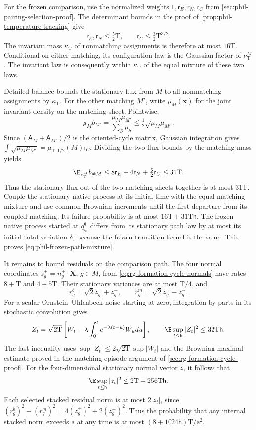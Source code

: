 For the frozen comparison, use the normalized weights
\(1,\mathsf r_E,\mathsf r_N,\mathsf r_C\) from
\cref{sec:phil-pairing-selection-proof}. The determinant bounds in the
proof of \cref{prop:phil-temperature-tracking} give
\[
 \mathsf r_E,\mathsf r_N\le\tfrac52\mathrm T,
 \qquad \mathsf r_C\le\tfrac32\mathrm T^{3/2}.
\]
The invariant mass \(\kappa_{\mathrm T}\) of nonmatching assignments
is therefore at most \(16\mathrm T\). Conditional on either matching,
its configuration law is the Gaussian factor of \(\nu_{\mathrm T}^M\).
The invariant law is consequently within \(\kappa_{\mathrm T}\) of
the equal mixture of these two laws.

Detailed balance bounds the stationary flux from \(M\) to all
nonmatching assignments by \(\kappa_{\mathrm T}\).
For the other matching \(M'\), write \(\mu_M(\mathbf x)\) for the
joint invariant density on the matching sheet. Pointwise,
\[
 \mu_M b_{M'}
 =\frac{\mu_M\mu_{M'}}{\sum_S\mu_S}
 \le\tfrac12\sqrt{\mu_M\mu_{M'}}.
\]
Since \((\mathsf A_M+\mathsf A_{M'})/2\) is the oriented-cycle
matrix, Gaussian integration gives
\(\int\sqrt{\mu_M\mu_{M'}}=\mu_{\mathrm T,1/2}(M)\mathsf r_C\).
Dividing the two flux bounds by the matching mass yields
\[
 \E_{\nu_{\mathrm T}^M}b_{\ne M}
 \le8\mathsf r_E+4\mathsf r_N+\tfrac52\mathsf r_C
 \le31\mathrm T.
\]
Thus the stationary flux out of the two matching sheets together is
at most \(31\mathrm T\). Couple the stationary native process at
its initial time with the equal matching mixture and use common
Brownian increments until the first departure from its coupled
matching. Its failure probability is at most
\(16\mathrm T+31\mathrm T\mathsf h\). The frozen native process
started at \(q_{t_0}^0\) differs from its stationary path law by at
most its initial total variation \(\delta\), because the frozen
transition kernel is the same. This proves
\cref{eq:phil-frozen-path-mixture}.

It remains to bound residuals on the comparison path.
The four normal coordinates
\(z_g^\pm=n_g^\pm\cdot\mathbf X\), \(g\in M\), from
\cref{eq:rg-formation-cycle-normals} have rates
\(8+\mathrm T\) and \(4+5\mathrm T\). Their stationary variances
are at most \(\mathrm T/4\), and
\[
 r_g^b=\sqrt2z_g^++z_g^-,\qquad
 r_g^m=\sqrt2z_g^+-z_g^-.
\]
For a scalar Ornstein--Uhlenbeck noise starting at zero, integration
by parts in its stochastic convolution gives
\[
 Z_t=\sqrt{2\mathrm T}
 \left[W_t-\lambda\int_0^te^{-\lambda(t-u)}W_u du\right],
 \qquad
 \E\sup_{t\le\mathsf h}|Z_t|^2\le32\mathrm T\mathsf h.
\]
The last inequality uses
\(\sup|Z_t|\le2\sqrt{2\mathrm T}\sup|W_t|\) and the Brownian
maximal estimate proved in the matching-episode argument of
\cref{sec:rg-formation-cycle-proof}.
For the four-dimensional stationary normal vector \(z\), it follows
that
\[
 \E\sup_{t\le\mathsf h}|z_t|^2
 \le2\mathrm T+256\mathrm T\mathsf h.
\]
Each selected stacked residual norm is at most \(2|z_t|\), since
\((r_g^b)^2+(r_g^m)^2=4(z_g^+)^2+2(z_g^-)^2\).
Thus the probability that any internal stacked norm exceeds
\(\mathsf a\) at any time is at most
\((8+1024\mathsf h)\mathrm T/\mathsf a^2\).

